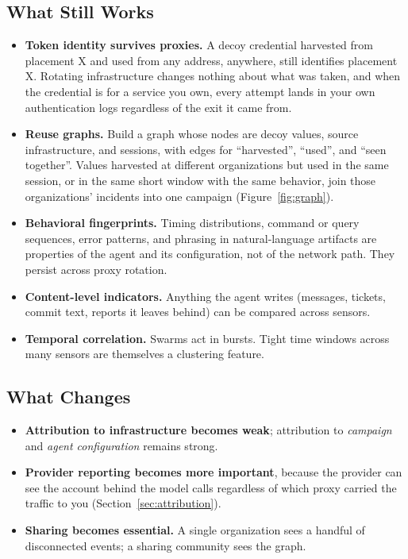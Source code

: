 \documentclass[11pt,letterpaper]{article}
\begin{document}
\subsection{What Still Works}
\label{sec:stillworks}

\begin{itemize}
  \item \textbf{Token identity survives proxies.} A decoy credential harvested from placement X and used from any address, anywhere, still identifies placement X. Rotating infrastructure changes nothing about what was taken, and when the credential is for a service you own, every attempt lands in your own authentication logs regardless of the exit it came from.
  \item \textbf{Reuse graphs.} Build a graph whose nodes are decoy values, source infrastructure, and sessions, with edges for ``harvested'', ``used'', and ``seen together''. Values harvested at different organizations but used in the same session, or in the same short window with the same behavior, join those organizations' incidents into one campaign (Figure~\ref{fig:graph}).
  \item \textbf{Behavioral fingerprints.} Timing distributions, command or query sequences, error patterns, and phrasing in natural-language artifacts are properties of the agent and its configuration, not of the network path. They persist across proxy rotation.
  \item \textbf{Content-level indicators.} Anything the agent writes (messages, tickets, commit text, reports it leaves behind) can be compared across sensors.
  \item \textbf{Temporal correlation.} Swarms act in bursts. Tight time windows across many sensors are themselves a clustering feature.
\end{itemize}

\subsection{What Changes}
\label{sec:changes}

\begin{itemize}
  \item \textbf{Attribution to infrastructure becomes weak}; attribution to \emph{campaign} and \emph{agent configuration} remains strong.
  \item \textbf{Provider reporting becomes more important}, because the provider can see the account behind the model calls regardless of which proxy carried the traffic to you (Section~\ref{sec:attribution}).
  \item \textbf{Sharing becomes essential.} A single organization sees a handful of disconnected events; a sharing community sees the graph.
\end{itemize}
\end{document}
